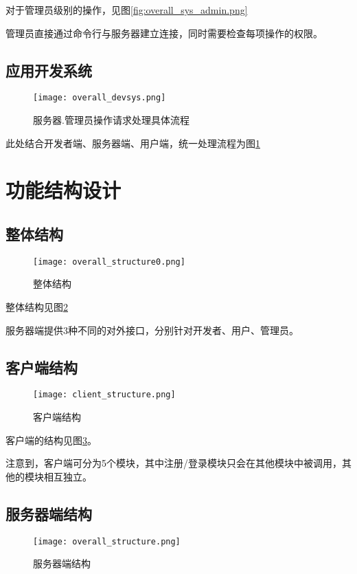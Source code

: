 对于管理员级别的操作，见图\ref{fig:overall_sys_admin.png}

管理员直接通过命令行与服务器建立连接，同时需要检查每项操作的权限。

{\color{red}
\subsection{应用开发系统}
\begin{figure}[ht]
	\centering
	\texttt{[image: overall\_devsys.png]}
	\caption{服务器.管理员操作请求处理具体流程} \label{fig:overall_devsys.png}
\end{figure}


此处结合开发者端、服务器端、用户端，统一处理流程为图\ref{fig:overall_devsys.png}

}

\section{功能结构设计}
\subsection{整体结构}
\begin{figure}[ht]
	\centering
	\texttt{[image: overall\_structure0.png]}
	\caption{整体结构} \label{fig:overall_structure0.png}
\end{figure}

整体结构见图\ref{fig:overall_structure0.png}

服务器端提供3种不同的对外接口，分别针对开发者、用户、管理员。


\subsection{客户端结构}
\begin{figure}[ht]
	\centering
	\texttt{[image: client\_structure.png]}
	\caption{客户端结构} \label{fig:client_structure}
\end{figure}

客户端的结构见图\ref{fig:client_structure}。

注意到，客户端可分为5个模块，其中注册/登录模块只会在其他模块中被调用，其他的模块相互独立。

\subsection{服务器端结构}
\begin{figure}[ht]
	\centering
	\texttt{[image: overall\_structure.png]}
	\caption{服务器端结构} \label{fig:overall_structure.png}
\end{figure}

